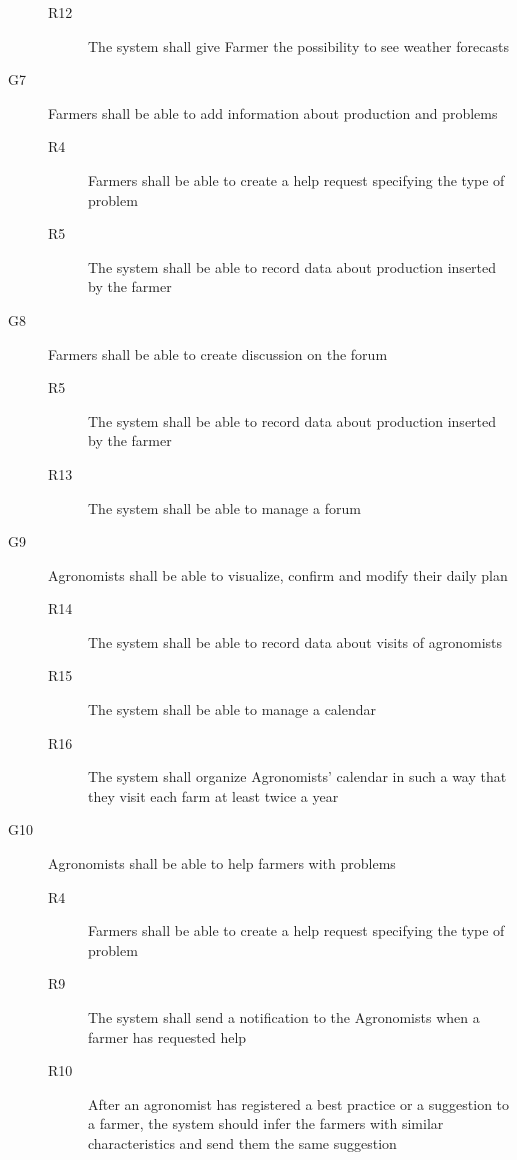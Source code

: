 \begin{description}
\begin{description}
            \item[R12] The system shall give Farmer the possibility to see weather forecasts
        \end{description}
    \item [G7] Farmers shall be able to add information about production and problems
        \begin{description}
            \item[R4] Farmers shall be able to create a help request specifying  the type of problem
            \item[R5] The system shall be able to record data about production inserted by the farmer
        \end{description}
    \item [G8] Farmers shall be able to create discussion on the forum
        \begin{description}
            \item[R5] The system shall be able to record data about production inserted by the farmer
            \item[R13] The system shall be able to manage a forum
        \end{description}
    \item [G9] Agronomists shall be able to visualize, confirm and modify their daily plan
        \begin{description}
            \item[R14] The system shall be able to record data about visits of agronomists
            \item[R15] The system shall be able to manage a calendar
            \item[R16] The system shall organize Agronomists' calendar in such a way that they visit each farm at least twice a year
        \end{description}
    \item [G10] Agronomists shall be able to help farmers with problems
    \begin{description}
        \item[R4] Farmers shall be able to create a help request specifying  the type of problem
        \item[R9] The system shall send a notification to the Agronomists when a farmer has requested help
        \item[R10] After an agronomist has registered a best practice or a suggestion to a farmer, the system should infer the farmers with similar characteristics and send them the same suggestion 

\end{description}
\end{description}
